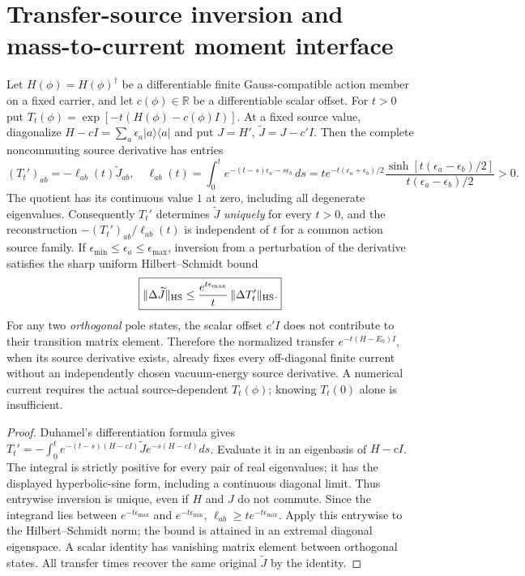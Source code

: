 \documentclass[12pt,a4paper]{article}
\begin{document}

\section{Transfer-source inversion and mass-to-current moment interface}
\label{p10:sec:v376-transfer-moment-inversion}
\begin{theorem}
\label{p10:thm:v376-positive-transfer-current-inversion}
Let $H(\phi)=H(\phi)^\dagger$ be a differentiable finite
Gauss-compatible action member on a fixed carrier, and let
$c(\phi)\in\mathbb R$ be a differentiable scalar offset.  For
$t>0$ put $T_t(\phi)=\exp[-t(H(\phi)-c(\phi)I)]$.
At a fixed source value, diagonalize $H-cI=\sum_a\epsilon_a
|a\rangle\langle a|$ and put $J=H'$, $\widetilde J=J-c'I$.
Then the complete noncommuting source derivative has entries
\[
 \boxed{ (T_t')_{ab}=-\ell_{ab}(t)\widetilde J_{ab},\quad
 \ell_{ab}(t)=\int_0^t e^{-(t-s)\epsilon_a-s\epsilon_b}\,ds
 =t e^{-t(\epsilon_a+\epsilon_b)/2}
 \frac{\sinh[t(\epsilon_a-\epsilon_b)/2]}
 {t(\epsilon_a-\epsilon_b)/2}>0. }
\]
The quotient has its continuous value $1$ at zero, including
all degenerate eigenvalues. Consequently $T_t'$ determines
$\widetilde J$ \emph{uniquely} for every $t>0$, and the
reconstruction $-(T_t')_{ab}/\ell_{ab}(t)$ is independent of
$t$ for a common action source family. If
$\epsilon_{\min}\le\epsilon_a\le\epsilon_{\max}$, inversion
from a perturbation of the derivative satisfies the sharp uniform
Hilbert--Schmidt bound
\[
 \boxed{\|\Delta\widetilde J\|_{\rm HS}
 \le \frac{e^{t\epsilon_{\max}}}{t}\,\|\Delta T_t'\|_{\rm HS}.}
\]
For any two \emph{orthogonal} pole states, the scalar offset
$c'I$ does not contribute to their transition matrix element.
Therefore the normalized transfer $e^{-t(H-E_0)I}$, when its
source derivative exists, already fixes every off-diagonal
finite current without an independently chosen vacuum-energy
source derivative. A numerical current requires the actual
source-dependent $T_t(\phi)$; knowing $T_t(0)$ alone is
insufficient.
\end{theorem}
\begin{proof}
Duhamel's differentiation formula gives
$T_t'=-\int_0^t e^{-(t-s)(H-cI)}\widetilde J
 e^{-s(H-cI)}ds$.
Evaluate it in an eigenbasis of $H-cI$. The integral is strictly
positive for every pair of real eigenvalues; it has the displayed
hyperbolic-sine form, including a continuous diagonal limit.
Thus entrywise inversion is unique, even if $H$ and $J$ do not
commute. Since the integrand lies between
$e^{-t\epsilon_{\max}}$ and $e^{-t\epsilon_{\min}}$,
$\ell_{ab}\ge t e^{-t\epsilon_{\max}}$. Apply this entrywise
to the Hilbert--Schmidt norm; the bound is attained in an
extremal diagonal eigenspace. A scalar identity has vanishing
matrix element between orthogonal states. All transfer times
recover the same original $\widetilde J$ by the identity.
\end{proof}
\end{document}
